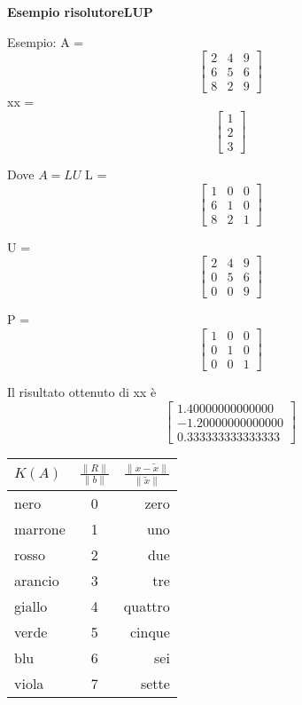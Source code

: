 \begin{flushleft}
	\textbf{Esempio risolutoreLUP}
	
	Esempio: 
	A = 
	\[\begin{bmatrix}
		2 & 4 & 9 \\ 
		6 & 5 & 6 \\
		8 & 2 & 9 
	\end{bmatrix}\]
	xx =
	\[\begin{bmatrix}
		1 \\
		2 \\
		3 
	\end{bmatrix}\]
	
	Dove $A = LU$
	L = 
	\[\begin{bmatrix}
		1 & 0 & 0 \\ 
		6 & 1 & 0 \\
		8 & 2 & 1 
	\end{bmatrix}\]
	
	U = 
	\[\begin{bmatrix}
		2 & 4 & 9 \\ 
		0 & 5 & 6 \\
		0 & 0 & 9 
	\end{bmatrix}\]
	
	P = 
	\[\begin{bmatrix}
		1 & 0 & 0 \\ 
		0 & 1 & 0 \\
		0 & 0 & 1 
	\end{bmatrix}\]
	
	Il risultato ottenuto di xx è
	\[\begin{bmatrix}
		1.40000000000000  \\
		-1.20000000000000 \\
		0.333333333333333 
	\end{bmatrix}\]
	
\end{flushleft}

\begin{tabular}{ | l | c | r | }
	\hline
	$K(A)$    & $\frac{\|R\|}{\|b\|}$ & $\frac{\|x-\tilde{x}\|}{\|\tilde{x}\|}$ \\
	\hline
	nero    & 0           & zero                                          \\
	marrone & 1           & uno                                           \\
	rosso   & 2           & due                                           \\
	arancio & 3           & tre                                           \\
	giallo  & 4           & quattro                                       \\
	verde   & 5           & cinque                                        \\
	blu     & 6           & sei                                           \\
	viola   & 7           & sette                                         \\
	\hline
\end{tabular}